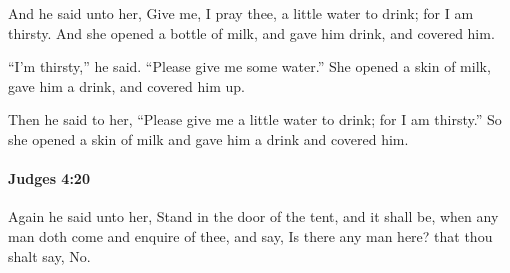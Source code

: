 			\begin{versebox}
					\item[BHS] 
					\item[ASV] And he said unto her, Give me, I pray thee, a little water to drink; for I am thirsty. And she opened a bottle of milk, and gave him drink, and covered him.
					\item[NIV] “I’m thirsty,” he said. “Please give me some water.” She opened a skin of milk, gave him a drink, and covered him up.
					\item[NRSV] Then he said to her, “Please give me a little water to drink; for I am thirsty.” So she opened a skin of milk and gave him a drink and covered him.
			\end{versebox}

		\paragraph{Judges 4:20} %
			\label{JUDGES-4-20}

			Again he said unto her, Stand in the door of the tent, and it shall be, when any man doth come and enquire of thee, and say, Is there any man here? that thou shalt say, No.

